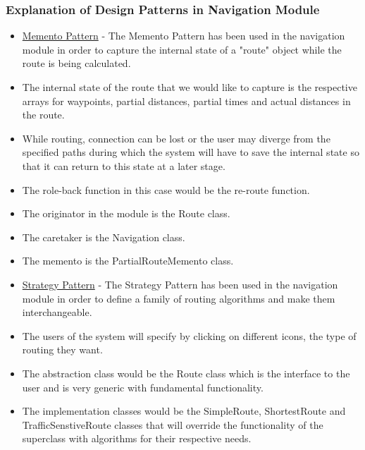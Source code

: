 \documentclass[runningheads,a4paper]{article}
\begin{document}
\subsubsection {Explanation of Design Patterns in Navigation Module}
\begin{itemize}

\item \underline{Memento Pattern} - The Memento Pattern has been used in the navigation module in order to capture the internal state of a "route" object while the route is being calculated.
\item The internal state of the route that we would like to capture is the respective arrays for waypoints, partial distances, partial times and actual distances in the route. 
\item While routing, connection can be lost or the user may diverge from the specified paths during which the system will have to save the internal state so that it can return to this state at a later stage.
\item The role-back function in this case would be the re-route function.
\item The originator in the module is the Route class.
\item The caretaker is the Navigation class.
\item The memento is the PartialRouteMemento class.

\item \underline{Strategy Pattern} - The Strategy Pattern has been used in the navigation module in order to define a family of routing algorithms and make them interchangeable.
\item The users of the system will specify by clicking on different icons, the type of routing they want.
\item The abstraction class would be the Route class which is the interface to the user and is very generic with fundamental functionality.
\item The implementation classes would be the SimpleRoute, ShortestRoute and TrafficSenstiveRoute classes that will override the functionality of the superclass with algorithms for their respective needs.

\end{itemize}
\end{document}

